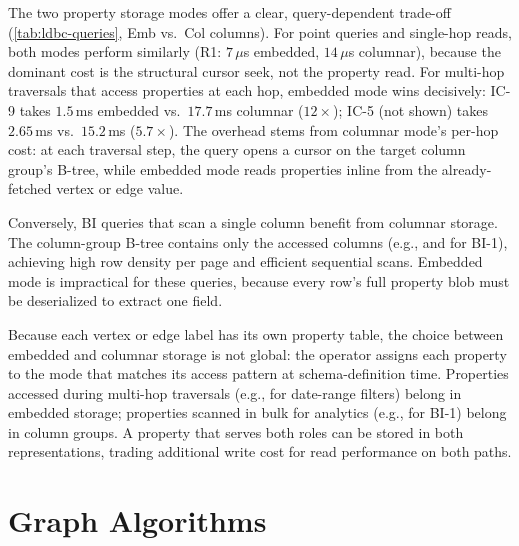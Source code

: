 The two property storage modes offer a clear, query-dependent trade-off (\autoref{tab:ldbc-queries}, Emb vs.\ Col columns).
For point queries and single-hop reads, both modes perform similarly (R1: $7$\,$\mu$s embedded, $14$\,$\mu$s columnar), because the dominant cost is the structural cursor seek, not the property read.
For multi-hop traversals that access properties at each hop, embedded mode wins decisively: IC-9 takes $1.5$\,ms embedded vs.\ $17.7$\,ms columnar ($12\times$); IC-5 (not shown) takes $2.65$\,ms vs.\ $15.2$\,ms ($5.7\times$).
The overhead stems from columnar mode's per-hop cost: at each traversal step, the query opens a cursor on the target column group's B-tree, while embedded mode reads properties inline from the already-fetched vertex or edge value.

Conversely, BI queries that scan a single column benefit from columnar storage.
The column-group B-tree contains only the accessed columns (e.g.,  and  for BI-1), achieving high row density per page and efficient sequential scans.
Embedded mode is impractical for these queries, because every row's full property blob must be deserialized to extract one field.

Because each vertex or edge label has its own property table, the choice between embedded and columnar storage is not global: the operator assigns each property to the mode that matches its access pattern at schema-definition time.
Properties accessed during multi-hop traversals (e.g.,  for date-range filters) belong in embedded storage; properties scanned in bulk for analytics (e.g.,  for BI-1) belong in column groups.
A property that serves both roles can be stored in both representations, trading additional write cost for read performance on both paths.

\section{Graph Algorithms}
\label{sec:eval:property-graphalytics}

